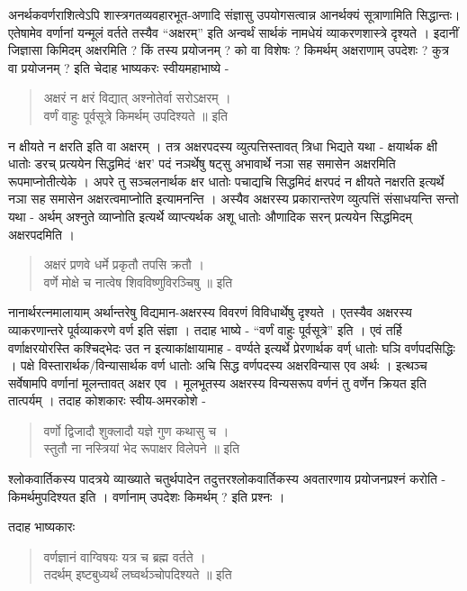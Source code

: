 अनर्थकवर्णराशित्वेऽपि शास्त्रगतव्यवहारभूत-अणादि संज्ञासु उपयोगसत्वान्न आनर्थक्यं सूत्राणामिति सिद्धान्तः। एतेषामेव वर्णानां यन्मूलं वर्तते तस्यैव “अक्षरम्” इति अन्वर्थं सार्थकं नामधेयं व्याकरणशास्त्रे दृश्यते । इदानीं जिज्ञासा किमिदम् अक्षरमिति ? किं तस्य प्रयोजनम् ? को वा विशेषः ? किमर्थम् अक्षराणाम् उपदेशः ? कुत्र वा प्रयोजनम् ? इति चेदाह भाष्यकरः स्वीयमहाभाष्ये - 		
\begin{verse}
अक्षरं न क्षरं विद्यात्  अश्नोतेर्वा सरोऽक्षरम् ।\\
वर्णं वाहुः पूर्वसूत्रे किमर्थम् उपदिश्यते ॥ इति
\end{verse}
न क्षीयते न क्षरति इति वा अक्षरम् । तत्र अक्षरपदस्य व्युत्पत्तिस्तावत् त्रिधा भिद्यते यथा - क्षयार्थक क्षी धातोः डरच् प्रत्ययेन सिद्धमिदं ‘क्षर’ पदं नञर्थेषु षट्सु अभावार्थे नञा सह समासेन अक्षरमिति रूपमाप्नोतीत्येके । अपरे तु सञ्चलनार्थक क्षर धातोः पचाद्यचि सिद्धमिदं क्षरपदं न क्षीयते नक्षरति इत्यर्थे नञा सह समासेन अक्षरत्वमाप्नोति इत्यामनन्ति । अस्यैव अक्षरस्य  प्रकारान्तरेण व्युत्पत्तिं संसाधयन्ति सन्तो यथा - अर्थम् अश्नुते व्याप्नोति इत्यर्थे व्याप्त्यर्थक अशू धातोः औणादिक सरन् प्रत्ययेन सिद्धमिदम् अक्षरपदमिति ।
\begin{verse}
अक्षरं प्रणवे धर्मे प्रकृतौ तपसि क्रतौ ।\\
वर्णे मोक्षे च नात्वेष शिवविष्णुविरञ्चिषु ॥ इति
\end{verse}
नानार्थरत्नमालायाम् अर्थान्तरेषु विद्यमान-अक्षरस्य विवरणं विविधार्थेषु दृश्यते । एतस्यैव अक्षरस्य व्याकरणान्तरे पूर्वव्याकरणे वर्ण इति संज्ञा । तदाह भाष्ये - “वर्णं वाहुः पूर्वसूत्रे” इति । एवं तर्हि वर्णाक्षरयोरस्ति कश्चिद्भेदः उत न इत्याकांक्षायामाह - वर्ण्यते इत्यर्थे प्रेरणार्थक वर्ण् धातोः घञि वर्णपदसिद्धिः । पक्षे विस्तारार्थक/विन्यासार्थक वर्ण धातोः अचि सिद्ध वर्णपदस्य अक्षरविन्यास एव अर्थः । इत्थञ्च सर्वेषामपि वर्णानां मूलन्तावत् अक्षर एव । मूलभूतस्य अक्षरस्य विन्यसरूप वर्णनं तु वर्णेन क्रियत इति तात्पर्यम् । तदाह कोशकारः स्वीय-अमरकोशे -
\begin{verse}
वर्णो द्विजादौ शुक्लादौ यज्ञे गुण कथासु च ।\\
स्तुतौ ना नस्त्रियां भेद रूपाक्षर विलेपने ॥  इति
\end{verse}
श्लोकवार्तिकस्य पादत्रये व्याख्याते चतुर्थपादेन तदुत्तरश्लोकवार्तिकस्य अवतारणाय प्रयोजनप्रश्नं करोति - किमर्थमुपदिश्यत इति । वर्णानाम् उपदेशः किमर्थम् ? इति प्रश्नः ।

तदाह भाष्यकारः 		
\begin{verse}
वर्णज्ञानं वाग्विषयः यत्र च ब्रह्म वर्तते । \\
तदर्थम् इष्टबुध्यर्थं लघ्वर्थञ्चोपदिश्यते ॥ इति
\end{verse}

